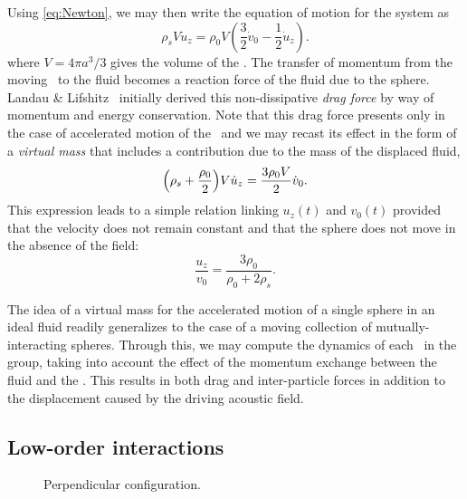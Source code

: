 Using \cref{eq:Newton}, we may then write the equation of motion for the system as
\begin{equation}
  \rho_s V \dot{u}_z = \rho_0 V \left(\frac{3}{2}\dot{v}_0 - \frac{1}{2}\dot{u}_z\right).
\end{equation}
where $V = 4\pi a^3/3$ gives the volume of the \bubble.
The transfer of momentum from the moving \bubble\ to the fluid becomes a reaction force of the fluid due to the sphere.
Landau \& Lifshitz~\cite{Landau2013} initially derived this non-dissipative \emph{drag force} by way of momentum and energy conservation.
Note that this drag force presents only in the case of accelerated motion of the \bubble\ and we may recast its effect in the form of a \emph{virtual mass} that includes a contribution due to the mass of the displaced fluid,
\begin{equation}
  \qty(\rho_s + \frac{\rho_0}{2})V \dot{u}_z = \frac{3\rho_0 V}{2} \dot{v}_0.
\end{equation}
This expression leads to a simple relation linking $u_z(t)$ and $v_0(t)$ provided that the velocity does not remain constant and that the sphere does not move in the absence of the field:
\begin{equation}
  \label{eq:landau result}
  \frac{u_z}{v_0} = \frac{3\rho_0}{\rho_0 + 2\rho_s}.
\end{equation}

The idea of a virtual mass for the accelerated motion of a single sphere in an ideal fluid readily generalizes to the case of a moving collection of mutually-interacting spheres.
Through this, we may compute the dynamics of each \bubble\ in the group, taking into account the effect of the momentum exchange between the fluid and the \bubbles.
This results in both drag and inter-particle forces in addition to the displacement caused by the driving acoustic field.

\subsection{Low-order interactions}

\begin{figure}
  \centering
  \caption{\label{fig:perpendicular}Perpendicular configuration.}
\end{figure}

